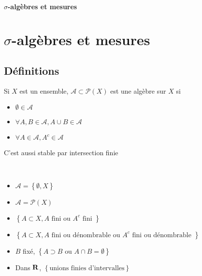 \ifsolo
    ~

    \vspace{1cm}

    \begin{center}
        \textbf{\LARGE $\sigma$-algèbres et mesures} \\[1em]
    \end{center}
    \tableofcontents
\else
    \chapter{\texorpdfstring{$\sigma$}{sigma}-algèbres et mesures}

    \minitoc
\fi
\thispagestyle{empty}

\section{Définitions}

\begin{dfn}
    Si $X$ est un ensemble,  $\mathcal  A \subset \mathcal  P(X)$ est une algèbre sur $X$ si  \begin{itemize}
        \item $\emptyset \in  \mathcal  A$
        \item $\forall  A, B \in  \mathcal  A, A \cup B \in  \mathcal  A$
        \item $\forall  A \in  \mathcal  A, A^c \in \mathcal  A$
    \end{itemize}
\end{dfn}

\begin{rem}
C'est aussi stable par intersection finie
\end{rem}

\begin{ex}~
\begin{itemize}
    \item $\mathcal  A= \left\{ \emptyset, X \right\} $
    \item $\mathcal  A = \mathcal  P(X)$
    \item $\left\{ A \subset X, A \text{ fini ou }A^c \text{ fini } \right\} $
    \item $\left\{ A \subset X, A \text{ fini ou dénombrable ou }A^c \text{ fini ou dénombrable } \right\} $ 
    \item $B$ fixé,  $\left\{ A \supset B \text{ ou } A\cap B=\emptyset\right\} $
    \item Dans $\mathbf R$, $\left\{ \text{unions finies d'intervalles} \right\} $
\end{itemize}
\end{ex}

